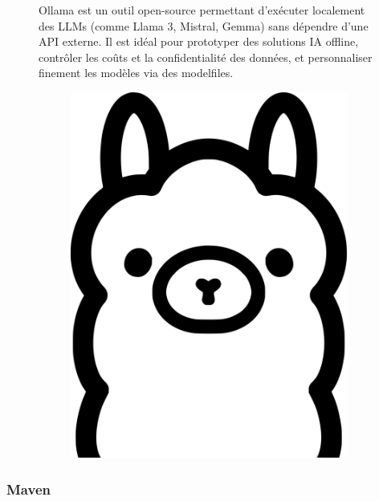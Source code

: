 \documentclass[12pt,a4paper]{report}
\begin{document}
	\begin{figure}[H]
		\begin{minipage}{0.8\textwidth}
			Ollama est un outil open-source permettant d’exécuter localement des LLMs (comme Llama 3, Mistral, Gemma) sans dépendre d’une API externe. Il est idéal pour prototyper des solutions IA offline, contrôler les coûts et la confidentialité des données, et personnaliser finement les modèles via des modelfiles. \cite{ollama}
		\end{minipage}
		\hfill
		\begin{minipage}{0.15\textwidth} 
			\begin{figure}[H]
				\centering
				\includegraphics[width=\linewidth]{ollama-logo.png}
				\label{fig:ollama-logo}
			\end{figure}
		\end{minipage}
	\end{figure}
	
	\subsubsection{Maven}
	
\end{document}

